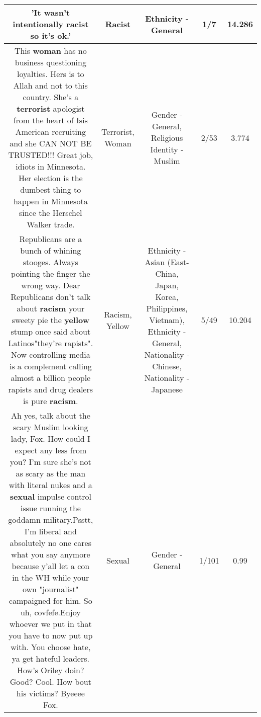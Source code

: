 \documentclass[11pt]{article}
\newlength\mylength
\begin{document}
\begin{center}
\begin{longtable}{|C{.65\mylength}|C{.30\mylength}|C{.12\mylength}|C{.12\mylength}|C{.12\mylength}|}
  \small 'It wasn't intentionally \textbf{racist} so it's ok.'\normalsize   & Racist & Ethnicity - General & 1/7 & 14.286 \\  \hline
  \small This \textbf{woman} has no business questioning loyalties.  Hers is to Allah and not to this country.  She's a \textbf{terrorist} apologist from the heart of Isis American recruiting and she CAN NOT BE TRUSTED!!!  Great job, idiots in Minnesota.  Her election is the dumbest thing to happen in Minnesota since the Herschel Walker trade.\normalsize   & Terrorist, Woman & Gender - General, Religious Identity - Muslim & 2/53 & 3.774 \\  \hline
  \small Republicans are a bunch of whining stooges. Always pointing the finger the wrong way. Dear Republicans don't talk about \textbf{racism} your sweety pie the \textbf{y\textbf{e\textbf{llow}}} stump once said about Latinos"they're rapists". Now controlling media is a complement calling almost a billion people rapists and drug dealers is pure \textbf{racism}.\normalsize   & Racism, Yellow & Ethnicity - Asian (East- China, Japan, Korea, Philippines, Vietnam), Ethnicity - General, Nationality - Chinese, Nationality - Japanese & 5/49 & 10.204 \\  \hline
  \small Ah yes, talk about the scary Muslim looking lady, Fox. How could I expect any less from you?  I'm sure she's not as scary as the man with literal nukes and a \textbf{sexual} impulse control issue running the goddamn military.Psstt, I'm liberal and absolutely no one cares what you say anymore because y'all let a con in the WH while your own "journalist" campaigned for him.  So uh, covfefe.Enjoy whoever we put in that you have to now put up with. You choose hate,  ya get hateful leaders. How's Oriley doin? Good? Cool. How bout his victims?  Byeeee Fox.\normalsize   & Sexual & Gender - General & 1/101 & 0.99 \\  \hline

\end{longtable}
\end{center}
\end{document}
